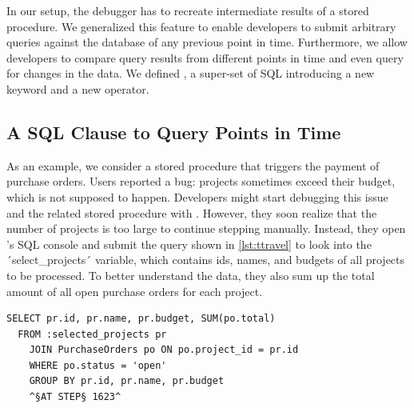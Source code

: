 \tmpStart

In our setup, the debugger has to recreate intermediate results of a stored procedure.
We generalized this feature to enable developers to submit arbitrary queries against the database of any previous point in time.
Furthermore, we allow developers to compare query results from different points in time and even query for changes in the data.
We defined \SQLextension, a super-set of SQL introducing a new keyword and a new operator.

\subsection{A SQL Clause to Query Points in Time}

As an example, we consider a stored procedure that triggers the payment of purchase orders.
Users reported a bug: projects sometimes exceed their budget, which is not supposed to happen.
Developers might start debugging this issue and the related stored procedure with \tool.
However, they soon realize that the number of projects is too large to continue stepping manually.
Instead, they open \tool's SQL console and submit the query shown in \cref{lst:ttravel} to look into the ´select_projects´ variable, which contains ids, names, and budgets of all projects to be processed.
To better understand the data, they also sum up the total amount of all open purchase orders for each project.


\begin{lstlisting}[language=HanaSQL,float,caption={Example for a time-travel query: select the current total of open orders for previously selected projects at step 1623 of the execution},label=lst:ttravel]
  SELECT pr.id, pr.name, pr.budget, SUM(po.total)
  FROM :selected_projects pr
	JOIN PurchaseOrders po ON po.project_id = pr.id
	WHERE po.status = 'open'
	GROUP BY pr.id, pr.name, pr.budget
	^§AT STEP§ 1623^
\end{lstlisting}

